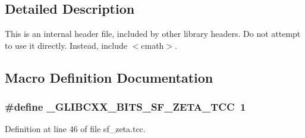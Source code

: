 \subsection{Detailed Description}
This is an internal header file, included by other library headers. Do not attempt to use it directly. Instead, include $<$cmath$>$. 

\subsection{Macro Definition Documentation}
\hypertarget{sf__zeta_8tcc_a23ad81fae0dc2d916125d596553c5dfc}{}
\subsubsection[{\+\_\+\+G\+L\+I\+B\+C\+X\+X\+\_\+\+B\+I\+T\+S\+\_\+\+S\+F\+\_\+\+Z\+E\+T\+A\+\_\+\+T\+C\+C}]{\setlength{\rightskip}{0pt plus 5cm}\#define \+\_\+\+G\+L\+I\+B\+C\+X\+X\+\_\+\+B\+I\+T\+S\+\_\+\+S\+F\+\_\+\+Z\+E\+T\+A\+\_\+\+T\+C\+C~1}\label{sf__zeta_8tcc_a23ad81fae0dc2d916125d596553c5dfc}


Definition at line 46 of file sf\+\_\+zeta.\+tcc.

